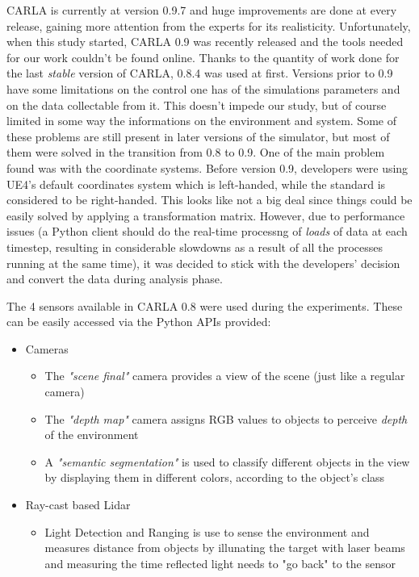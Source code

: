 CARLA is currently at version 0.9.7 and huge improvements are done at every release, gaining more attention from the experts for its realisticity. Unfortunately, when this study started, CARLA 0.9 was recently released and the tools needed for our work couldn't be found online. Thanks to the quantity of work done for the last \textit{stable} version of CARLA, 0.8.4 was used at first.\newline
Versions prior to 0.9 have some limitations on the control one has of the simulations parameters and on the data collectable from it. This doesn't impede our study, but of course limited in some way the informations on the environment and system. Some of these problems are still present in later versions of the simulator, but most of them were solved in the transition from 0.8 to 0.9.\newline\newline
One of the main problem found was with the coordinate systems. Before version 0.9, developers were using UE4's default coordinates system which is left-handed, while the standard is considered to be right-handed. This looks like not a big deal since things could be easily solved by applying a transformation matrix. However, due to performance issues (a Python client should do the real-time processng of \textsl{loads} of data at each timestep, resulting in considerable slowdowns as a result of all the processes running at the same time), it was decided to stick with the developers' decision and convert the data during analysis phase.

The 4 sensors available in CARLA 0.8 were used during the experiments. These can be easily accessed via the Python APIs provided:

\begin{itemize}
	\item Cameras
	\begin{itemize}
		\item The \textsl{"scene final"} camera provides a view of the scene (just like a regular camera)
		\item The \textsl{"depth map"} camera assigns RGB values to objects to perceive \textsl{depth} of the environment
		\item A \textsl{"semantic segmentation"} is used to classify different objects in the view by displaying them in different colors, according to the object's class
	\end{itemize}
	\item Ray-cast based Lidar
	\begin{itemize}
		\item Light Detection and Ranging is use to sense the environment and measures distance from objects by illunating the target with laser beams and measuring the time reflected light needs to "go back" to the sensor
	\end{itemize}
\end{itemize}

